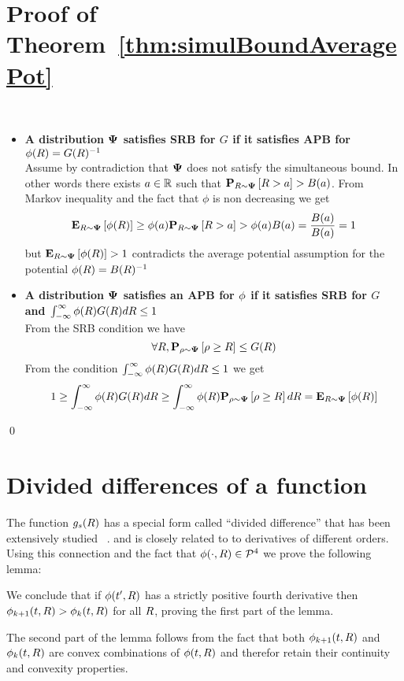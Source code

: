 \documentclass{article}[12pt]
\begin{document}
\section{Proof of Theorem~\ref{thm:simulBoundAveragePot} \label{proof:simulBoundAveragePot}}
\proof
~\\
\begin{itemize}
  \item
  {\bf A distribution ${\bf \Psi}$ satisfies SRB for $G$ if it satisfies APB
  for $\phi(R) = G(R)^{-1}$}\\
Assume by contradiction that ${\bf \Psi}$ does not satisfy the simultaneous bound. In
other words there exists $a \in \mathbb{R}$ such that
${\bf P}_{R \sim {\bf \Psi}}\left[ R > a \right] > B(a)$. From Markov inequality and the fact
that $\phi$ is non decreasing we get
\[
  {\bf E}_{R \sim {\bf \Psi}}\left[ \phi(R) \right] \geq \phi(a) {\bf P}_{R \sim {\bf \Psi}}\left[ R > a \right] >
  \phi(a) B(a) = \frac{B(a)}{B(a)}=1
\]
but $ {\bf E}_{R \sim {\bf \Psi}}\left[ \phi(R) \right] >1$ contradicts the average potential
assumption for the potential $\phi(R) = B(R)^{-1}$
\item {\bf A distribution ${\bf \Psi}$ satisfies an
    APB for $\phi$ if it satisfies SRB for $G$ and $\int_{-\infty}^{\infty}\phi(R) G(R) dR \leq 1$}\\
  From the SRB condition we have
  $$\forall R, {\bf P}_{\rho \sim {\bf \Psi}}\left[ \rho \geq R \right] \leq G(R)$$
  From the condition  $\int_{-\infty}^{\infty}\phi(R) G(R) dR \leq 1$ we get
  $$1 \geq \int_{-\infty}^{\infty}\phi(R) G(R) dR \geq
  \int_{-\infty}^{\infty}\phi(R) {\bf P}_{\rho \sim {\bf \Psi}}\left[ \rho\geq R \right]
  dR = {\bf E}_{R \sim {\bf \Psi}}\left[ \phi(R) \right]$$
\end{itemize}
\qed

\section{Divided differences of a function} \label{sec:divdiff}

The function $g_s(R)$ has a special form called ``divided difference''
that has been extensively studied ~\cite{popoviciu1965certaines,butt2016generalization, de2005divided}.
and is closely related to to derivatives of different orders. Using
this connection and the fact that $\phi(\cdot,R) \in {\cal P}^{4}$ we prove
the following lemma:


We conclude that if $\phi(t',R)$ has a strictly positive fourth
derivative then $\phi_{k+1}(t,R) > \phi_{k}(t,R)$ for all $R$, proving
the first part of the lemma.

The second part of the lemma follows from the fact that
both $\phi_{k+1}(t,R)$ and $\phi_{k}(t,R)$ are convex combinations of
$\phi(t,R)$ and therefor retain their continuity and convexity properties.
\end{document}

